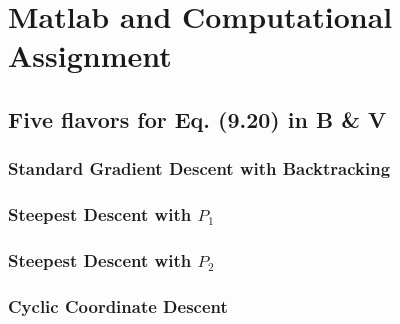 \documentclass[11pt,a4paper]{article}
\begin{document}
\begin{titlepage}
    \maketitle
\end{titlepage}
\renewcommand{\contentsname}{Table of Contents}
\begin{center} 
    \tableofcontents 
    \listoffigures
\end{center}
\newpage

\section{Matlab and Computational Assignment}
\subsection{Five flavors for Eq. (9.20) in B \& V}
\subsubsection{Standard Gradient Descent with Backtracking}
\subsubsection{Steepest Descent with $P_1$}

\subsubsection{Steepest Descent with $P_2$}

\subsubsection{Cyclic Coordinate Descent}
\end{document}
